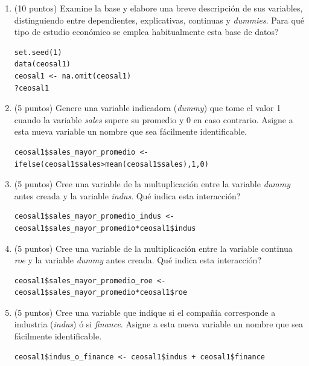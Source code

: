 \documentclass[letterpaper,11pt]{article}
\begin{document}
\begin{enumerate}

\item (10 puntos) Examine la base y elabore una breve descripción de sus variables, distinguiendo entre dependientes, explicativas, continuas y \textit{dummies}. \textquestiondown Para qué tipo de estudio económico se emplea habitualmente esta base de datos?

\begin{lstlisting}
set.seed(1)
data(ceosal1)
ceosal1 <- na.omit(ceosal1)
?ceosal1
\end{lstlisting}


    \item (5 puntos) Genere una variable indicadora (\textit{dummy}) que tome el valor 1 cuando la variable \textit{sales} supere su promedio y 0 en caso contrario. Asigne a esta nueva variable un nombre que sea fácilmente identificable.
    

\begin{lstlisting}
ceosal1$sales_mayor_promedio <- ifelse(ceosal1$sales>mean(ceosal1$sales),1,0)
\end{lstlisting}

    \item (5 puntos) Cree una variable de la multuplicación entre la variable \textit{dummy} antes creada y la variable \textit{indus}. \textquestiondown Qué indica esta interacción?

\begin{lstlisting}
ceosal1$sales_mayor_promedio_indus <- ceosal1$sales_mayor_promedio*ceosal1$indus
\end{lstlisting}


    \item (5 puntos) Cree una variable de la multiplicación entre la variable continua \textit{roe}  y la variable \textit{dummy} antes creada. \textquestiondown Qué indica esta interacción?
\begin{lstlisting}
ceosal1$sales_mayor_promedio_roe <- ceosal1$sales_mayor_promedio*ceosal1$roe
\end{lstlisting}


    \item (5 puntos) Cree una variable que indique si el compañia corresponde a industria (\textit{indus}) ó si \textit{finance}.  Asigne a esta nueva variable un nombre que sea fácilmente identificable.
\begin{lstlisting}
ceosal1$indus_o_finance <- ceosal1$indus + ceosal1$finance
\end{lstlisting}


\end{enumerate}
\end{document}
